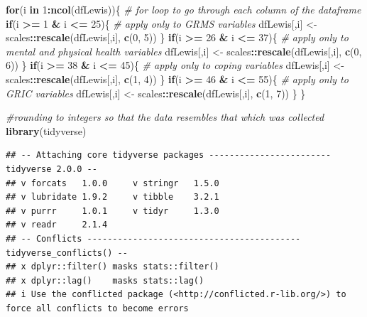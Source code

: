 \documentclass[
  11pt,
]{book}
\newenvironment{Shaded}{\begin{snugshade}}{\end{snugshade}}
\newcommand{\CommentTok}[1]{\textcolor[rgb]{0.37,0.37,0.37}{\textit{#1}}}
\newcommand{\ControlFlowTok}[1]{\textcolor[rgb]{0.27,0.27,0.27}{\textbf{#1}}}
\newcommand{\DecValTok}[1]{\textcolor[rgb]{0.06,0.06,0.06}{#1}}
\newcommand{\FunctionTok}[1]{\textcolor[rgb]{0.27,0.27,0.27}{\textbf{#1}}}
\newcommand{\NormalTok}[1]{#1}
\newcommand{\OtherTok}[1]{\textcolor[rgb]{0.37,0.37,0.37}{#1}}
\newcommand{\SpecialCharTok}[1]{\textcolor[rgb]{0.43,0.43,0.43}{\textbf{#1}}}
\begin{document}
\begin{Shaded}
\begin{Highlighting}[]
\ControlFlowTok{for}\NormalTok{(i }\ControlFlowTok{in} \DecValTok{1}\SpecialCharTok{:}\FunctionTok{ncol}\NormalTok{(dfLewis))\{  }\CommentTok{\# for loop to go through each column of the dataframe }
  \ControlFlowTok{if}\NormalTok{(i }\SpecialCharTok{\textgreater{}=} \DecValTok{1} \SpecialCharTok{\&}\NormalTok{ i }\SpecialCharTok{\textless{}=} \DecValTok{25}\NormalTok{)\{   }\CommentTok{\# apply only to GRMS variables}
\NormalTok{    dfLewis[,i] }\OtherTok{\textless{}{-}}\NormalTok{ scales}\SpecialCharTok{::}\FunctionTok{rescale}\NormalTok{(dfLewis[,i], }\FunctionTok{c}\NormalTok{(}\DecValTok{0}\NormalTok{, }\DecValTok{5}\NormalTok{))}
\NormalTok{  \}}
  \ControlFlowTok{if}\NormalTok{(i }\SpecialCharTok{\textgreater{}=} \DecValTok{26} \SpecialCharTok{\&}\NormalTok{ i }\SpecialCharTok{\textless{}=} \DecValTok{37}\NormalTok{)\{   }\CommentTok{\# apply only to mental and physical health variables }
\NormalTok{    dfLewis[,i] }\OtherTok{\textless{}{-}}\NormalTok{ scales}\SpecialCharTok{::}\FunctionTok{rescale}\NormalTok{(dfLewis[,i], }\FunctionTok{c}\NormalTok{(}\DecValTok{0}\NormalTok{, }\DecValTok{6}\NormalTok{))}
\NormalTok{  \}}
  \ControlFlowTok{if}\NormalTok{(i }\SpecialCharTok{\textgreater{}=} \DecValTok{38} \SpecialCharTok{\&}\NormalTok{ i }\SpecialCharTok{\textless{}=} \DecValTok{45}\NormalTok{)\{   }\CommentTok{\# apply only to coping variables}
\NormalTok{    dfLewis[,i] }\OtherTok{\textless{}{-}}\NormalTok{ scales}\SpecialCharTok{::}\FunctionTok{rescale}\NormalTok{(dfLewis[,i], }\FunctionTok{c}\NormalTok{(}\DecValTok{1}\NormalTok{, }\DecValTok{4}\NormalTok{))}
\NormalTok{  \}}
  \ControlFlowTok{if}\NormalTok{(i }\SpecialCharTok{\textgreater{}=} \DecValTok{46} \SpecialCharTok{\&}\NormalTok{ i }\SpecialCharTok{\textless{}=} \DecValTok{55}\NormalTok{)\{   }\CommentTok{\# apply only to GRIC variables}
\NormalTok{    dfLewis[,i] }\OtherTok{\textless{}{-}}\NormalTok{ scales}\SpecialCharTok{::}\FunctionTok{rescale}\NormalTok{(dfLewis[,i], }\FunctionTok{c}\NormalTok{(}\DecValTok{1}\NormalTok{, }\DecValTok{7}\NormalTok{))}
\NormalTok{  \}}
\NormalTok{\}}

\CommentTok{\#rounding to integers so that the data resembles that which was collected}
\FunctionTok{library}\NormalTok{(tidyverse)}
\end{Highlighting}
\end{Shaded}

\begin{verbatim}
## -- Attaching core tidyverse packages ------------------------ tidyverse 2.0.0 --
## v forcats   1.0.0     v stringr   1.5.0
## v lubridate 1.9.2     v tibble    3.2.1
## v purrr     1.0.1     v tidyr     1.3.0
## v readr     2.1.4     
## -- Conflicts ------------------------------------------ tidyverse_conflicts() --
## x dplyr::filter() masks stats::filter()
## x dplyr::lag()    masks stats::lag()
## i Use the conflicted package (<http://conflicted.r-lib.org/>) to force all conflicts to become errors
\end{verbatim}
\end{document}
